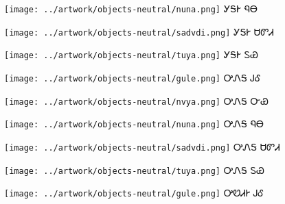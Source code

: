 \documentclass[avery5371,frame]{flashcards}%
\begin{document}
\begin{flashcard}{
\texttt{[image: ../artwork/objects-neutral/nuna.png]}
}\Huge ᎩᎦᎨ ᏄᎾ
\end{flashcard}

\begin{flashcard}{
\texttt{[image: ../artwork/objects-neutral/sadvdi.png]}
}\Huge ᎩᎦᎨ ᏌᏛᏗ
\end{flashcard}

\begin{flashcard}{
\texttt{[image: ../artwork/objects-neutral/tuya.png]}
}\Huge ᎩᎦᎨ ᏚᏯ
\end{flashcard}

\begin{flashcard}{
\texttt{[image: ../artwork/objects-neutral/gule.png]}
}\Huge ᎤᏁᎦ ᎫᎴ
\end{flashcard}

\begin{flashcard}{
\texttt{[image: ../artwork/objects-neutral/nvya.png]}
}\Huge ᎤᏁᎦ ᏅᏯ
\end{flashcard}

\begin{flashcard}{
\texttt{[image: ../artwork/objects-neutral/nuna.png]}
}\Huge ᎤᏁᎦ ᏄᎾ
\end{flashcard}

\begin{flashcard}{
\texttt{[image: ../artwork/objects-neutral/sadvdi.png]}
}\Huge ᎤᏁᎦ ᏌᏛᏗ
\end{flashcard}

\begin{flashcard}{
\texttt{[image: ../artwork/objects-neutral/tuya.png]}
}\Huge ᎤᏁᎦ ᏚᏯ
\end{flashcard}

\begin{flashcard}{
\texttt{[image: ../artwork/objects-neutral/gule.png]}
}\Huge ᎤᏬᏗᎨ ᎫᎴ
\end{flashcard}
\end{document}
